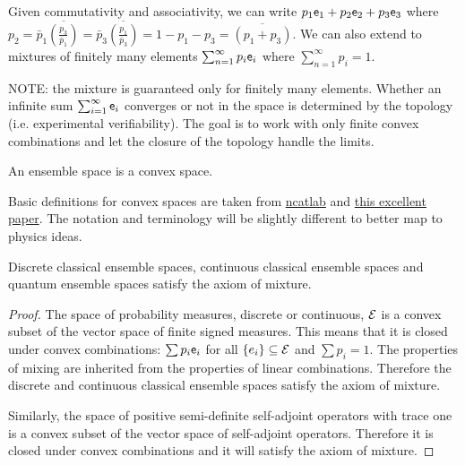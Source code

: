 \begin{remark}
	Given commutativity and associativity, we can write $p_1 \mathsf{e}_1 + p_2 \mathsf{e}_2 + p_3 \mathsf{e}_3$ where $p_2 = \bar{p}_1\overline{\left(\frac{p_3}{\bar{p}_1}\right)} = \bar{p}_3\overline{\left(\frac{p_1}{\bar{p}_3}\right)} = 1 - p_1 - p_3 = \overline{\left(p_1 + p_3\right)}$. We can also extend to mixtures of finitely many elements $\sum_{n=1}^\infty p_i \mathsf{e}_i$ where $\sum_{n=1}^\infty p_i = 1$.
	
	NOTE: the mixture is guaranteed only for finitely many elements. Whether an infinite sum $\sum_{i=1}^\infty \mathsf{e}_i$ converges or not in the space is determined by the topology (i.e. experimental verifiability). The goal is to work with only finite convex combinations and let the closure of the topology handle the limits.
\end{remark}

\begin{coro}
	An ensemble space is a convex space.
\end{coro}

\begin{remark}
	Basic definitions for convex spaces are taken from \href{https://ncatlab.org/nlab/show/convex+space}{ncatlab} and \href{https://arxiv.org/abs/0903.5522}{this excellent paper}. The notation and terminology will be slightly different to better map to physics ideas. 
\end{remark}

\begin{prop}
	Discrete classical ensemble spaces, continuous classical ensemble spaces and quantum ensemble spaces satisfy the axiom of mixture.
\end{prop}

\begin{proof}
	The space of probability measures, discrete or continuous, $\mathcal{E}$ is a convex subset of the vector space of finite signed measures. This means that it is closed under convex combinations: $\sum p_i \mathsf{e}_i$ for all $\{e_i\} \subseteq \mathcal{E}$ and $\sum p_i = 1$. The properties of mixing are inherited from the properties of linear combinations. Therefore the discrete and continuous classical ensemble spaces satisfy the axiom of mixture.
	
	Similarly, the space of positive semi-definite self-adjoint operators with trace one is a convex subset of the vector space of self-adjoint operators. Therefore it is closed under convex combinations and it will satisfy the axiom of mixture.
\end{proof}

